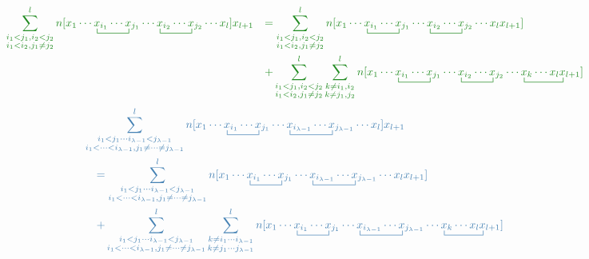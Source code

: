 \documentclass{article}
\newcommand{\ctr}{\bcontraction}
\newcommand{\cd}{\ensuremath{\cdots} }
\def\cb#1{{\color{blue}#1}}
\def\cg#1{{\color{green}#1}}
\begin{document}
\begin{align*}
\cg{ \sum_{\substack{i_1 < j_1,  i_2 < j_2 \\ i_1 < i_2, j_1 \neq j_2}}^l
n[x_1 \cd \ctr{}{x}{{}_{i_1}\cd}{x} x_{i_1}  \cd x_{j_1} \cd \ctr{}{x}{{}_{i_2}\cd}{x} x_{i_2}  \cd x_{j_2} \cd x_l ] x_{l + 1} } 
& \quad \cg{ =\sum_{\substack{i_1 < j_1,  i_2 < j_2 \\ i_1 < i_2, j_1 \neq j_2}}^l
n[x_1 \cd \ctr{}{x}{{}_{i_1}\cd}{x} x_{i_1}  \cd x_{j_1} \cd \ctr{}{x}{{}_{i_2}\cd}{x} x_{i_2}  \cd x_{j_2} \cd x_l x_{l + 1}  ] }   \\
& \quad \cg{ + \sum_{\substack{i_1 < j_1,  i_2 < j_2 \\ i_1 < i_2, j_1 \neq j_2}}^l \sum_{\substack{k\neq i_1, i_2 \\ k\neq j_1, j_2} }^{l}
n[x_1 \cd \ctr{}{x}{{}_{i_1}\cd}{x} x_{i_1}  \cd x_{j_1} \cd \ctr{}{x}{{}_{i_2}\cd}{x} x_{i_2}  \cd x_{j_2} \cd \ctr{}{x}{{}_k \cd  x_l}{x}  x_k \cd x_l x_{l + 1}  ] }   \\
\end{align*}
\begin{align*}
& \cb{ \sum_{\substack{i_1 <  j_1 \cd  i_{\lambda - 1} < j_{\lambda - 1} \\ i_1 < \cd < i_{\lambda - 1}, j_1 \neq \cd \neq j_{\lambda-1}}}^l
n[x_1 \cd \ctr{}{x}{{}_{i_1}\cd}{x} x_{i_1}  \cd x_{j_1} \cd \ctr{}{x}{{}_{i_{\lambda -1} }\cd}{x} x_{i_{\lambda-1}}  \cd x_{j_{\lambda - 1}} \cd x_l ] x_{l + 1} }  \\
& \quad \cb{ =  \sum_{\substack{i_1 <  j_1 \cd  i_{\lambda - 1} < j_{\lambda - 1} \\ i_1 < \cd < i_{\lambda - 1}, j_1 \neq \cd \neq j_{\lambda-1}}}^l
n[x_1 \cd \ctr{}{x}{{}_{i_1}\cd}{x} x_{i_1}  \cd x_{j_1} \cd \ctr{}{x}{{}_{i_{\lambda -1} }\cd}{x} x_{i_{\lambda-1}}  \cd x_{j_{\lambda - 1}} \cd x_l x_{l + 1} ]  } \\
& \quad \cb{ + \sum_{\substack{i_1 <  j_1 \cd  i_{\lambda - 1} < j_{\lambda - 1} \\ i_1 < \cd < i_{\lambda - 1}, j_1 \neq \cd \neq j_{\lambda-1}}}^l
\sum_{\substack{k\neq i_1 \cd i_{\lambda-1} \\ k\neq j_1\cd j_{\lambda - 1}} }^{l}
n[x_1 \cd \ctr{}{x}{{}_{i_1}\cd}{x} x_{i_1}  \cd x_{j_1} \cd \ctr{}{x}{{}_{i_{\lambda -1} }\cd}{x} x_{i_{\lambda-1}}  \cd x_{j_{\lambda - 1}} \cd \ctr{}{x}{{}_k \cd  x_l}{x}  x_k \cd x_l x_{l + 1} ]  } \\
\end{align*}
\end{document}
